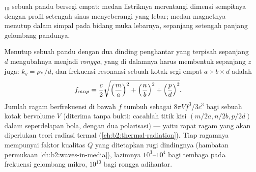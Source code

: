 \begin{omfigure}

{\small {}$_{10}$ sebuah pandu bersegi empat: medan listriknya
merentangi dimensi sempitnya dengan profil setengah sinus menyeberangi yang
lebar; medan magnetnya menutup dalam simpal pada bidang muka
lebarnya, sepanjang setengah panjang gelombang pandunya.}
\end{omfigure}

\begin{proposition}\label{prop:b2:guided-waves:cavity}
Menutup sebuah pandu dengan dua dinding penghantar yang terpisah sepanjang $d$ mengubahnya
menjadi \emph{rongga}, yang di dalamnya  harus membentuk  sepanjang $z$ juga: $k_g = p\pi/d$, dan frekuensi resonansi sebuah
kotak segi empat $a \times b \times d$ adalah
\[
f_{mnp} = \frac c2\sqrt{\Bigl(\frac ma\Bigr)^2 + \Bigl(\frac nb\Bigr)^2 + \Bigl(\frac pd\Bigr)^2} .
\]
Jumlah ragam berfrekuensi di bawah $f$ tumbuh sebagai $8\pi V f^3/3c^3$ bagi
sebuah kotak bervolume $V$ (diterima tanpa bukti: cacahlah titik kisi
$(m/2a, n/2b, p/2d)$ dalam seperdelapan bola, dengan dua polarisasi)
--- yaitu rapat ragam yang akan diperlukan teori radiasi
termal (\cref{ch:b2:thermal-radiation}). Tiap ragamnya mempunyai faktor kualitas
$Q$ yang ditetapkan rugi dindingnya (hambatan permukaan
\cref{ch:b2:waves-in-media}), lazimnya $10^3$--$10^4$ bagi tembaga pada
frekuensi gelombang mikro, $10^{10}$ bagi rongga adihantar.
\end{proposition}

